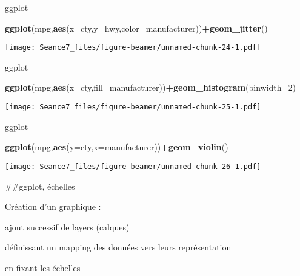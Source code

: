 \documentclass[ignorenonframetext,]{beamer}
\newenvironment{Shaded}{\begin{snugshade}}{\end{snugshade}}
\newcommand{\DataTypeTok}[1]{\textcolor[rgb]{0.13,0.29,0.53}{#1}}
\newcommand{\DecValTok}[1]{\textcolor[rgb]{0.00,0.00,0.81}{#1}}
\newcommand{\KeywordTok}[1]{\textcolor[rgb]{0.13,0.29,0.53}{\textbf{#1}}}
\newcommand{\NormalTok}[1]{#1}
\newcommand{\OperatorTok}[1]{\textcolor[rgb]{0.81,0.36,0.00}{\textbf{#1}}}
\begin{document}
\begin{frame}[fragile]{ggplot}
\protect\hypertarget{ggplot-4}{}

\begin{Shaded}
\begin{Highlighting}[]
\KeywordTok{ggplot}\NormalTok{(mpg,}\KeywordTok{aes}\NormalTok{(}\DataTypeTok{x=}\NormalTok{cty,}\DataTypeTok{y=}\NormalTok{hwy,}\DataTypeTok{color=}\NormalTok{manufacturer))}\OperatorTok{+}\KeywordTok{geom_jitter}\NormalTok{()}
\end{Highlighting}
\end{Shaded}

\texttt{[image: Seance7\_files/figure-beamer/unnamed-chunk-24-1.pdf]}

\end{frame}

\begin{frame}[fragile]{ggplot}
\protect\hypertarget{ggplot-5}{}

\begin{Shaded}
\begin{Highlighting}[]
\KeywordTok{ggplot}\NormalTok{(mpg,}\KeywordTok{aes}\NormalTok{(}\DataTypeTok{x=}\NormalTok{cty,}\DataTypeTok{fill=}\NormalTok{manufacturer))}\OperatorTok{+}\KeywordTok{geom_histogram}\NormalTok{(}\DataTypeTok{binwidth=}\DecValTok{2}\NormalTok{)}
\end{Highlighting}
\end{Shaded}

\texttt{[image: Seance7\_files/figure-beamer/unnamed-chunk-25-1.pdf]}

\end{frame}

\begin{frame}[fragile]{ggplot}
\protect\hypertarget{ggplot-6}{}

\begin{Shaded}
\begin{Highlighting}[]
\KeywordTok{ggplot}\NormalTok{(mpg,}\KeywordTok{aes}\NormalTok{(}\DataTypeTok{y=}\NormalTok{cty,}\DataTypeTok{x=}\NormalTok{manufacturer))}\OperatorTok{+}\KeywordTok{geom_violin}\NormalTok{()}
\end{Highlighting}
\end{Shaded}

\texttt{[image: Seance7\_files/figure-beamer/unnamed-chunk-26-1.pdf]}

\#\#{ggplot, échelles}

Création d'un graphique :

ajout successif de layers (calques)

définissant un mapping des données vers leurs représentation

en fixant les échelles

\end{frame}
\end{document}
